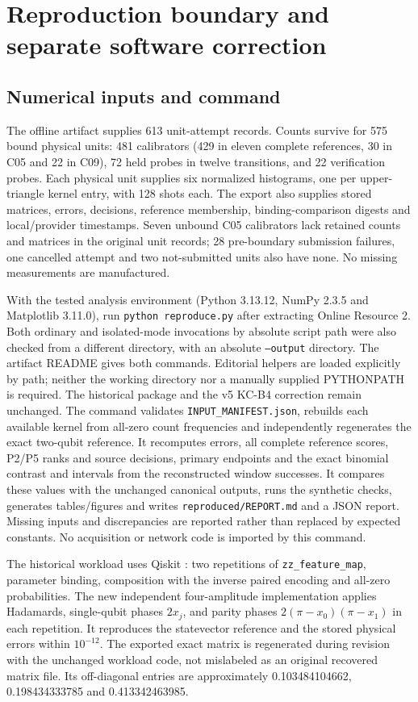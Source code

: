 \documentclass[11pt,a4paper]{article}
\begin{document}
\section{Reproduction boundary and separate software correction}
\subsection{Numerical inputs and command}
The offline artifact supplies 613 unit-attempt records. Counts survive for 575 bound physical units: 481 calibrators (429 in eleven complete references, 30 in C05 and 22 in C09), 72 held probes in twelve transitions, and 22 verification probes. Each physical unit supplies six normalized histograms, one per upper-triangle kernel entry, with 128 shots each. The export also supplies stored matrices, errors, decisions, reference membership, binding-comparison digests and local/provider timestamps. Seven unbound C05 calibrators lack retained counts and matrices in the original unit records; 28 pre-boundary submission failures, one cancelled attempt and two not-submitted units also have none. No missing measurements are manufactured.

With the tested analysis environment (Python 3.13.12, NumPy 2.3.5 and Matplotlib 3.11.0), run \texttt{python reproduce.py} after extracting Online Resource 2. Both ordinary and isolated-mode invocations by absolute script path were also checked from a different directory, with an absolute \texttt{--output} directory. The artifact README gives both commands. Editorial helpers are loaded explicitly by path; neither the working directory nor a manually supplied PYTHONPATH is required. The historical package and the v5 KC-B4 correction remain unchanged. The command validates \texttt{INPUT\_MANIFEST.json}, rebuilds each available kernel from all-zero count frequencies and independently regenerates the exact two-qubit reference. It recomputes errors, all complete reference scores, P2/P5 ranks and source decisions, primary endpoints and the exact binomial contrast and intervals from the reconstructed window successes. It compares these values with the unchanged canonical outputs, runs the synthetic checks, generates tables/figures and writes \texttt{reproduced/REPORT.md} and a JSON report. Missing inputs and discrepancies are reported rather than replaced by expected constants. No acquisition or network code is imported by this command.

The historical workload uses Qiskit \cite{javadiabhari2024qiskit}: two repetitions of \texttt{zz\_feature\_map}, parameter binding, composition with the inverse paired encoding and all-zero probabilities. The new independent four-amplitude implementation applies Hadamards, single-qubit phases $2x_j$, and parity phases $2(\pi-x_0)(\pi-x_1)$ in each repetition. It reproduces the statevector reference and the stored physical errors within $10^{-12}$. The exported exact matrix is regenerated during revision with the unchanged workload code, not mislabeled as an original recovered matrix file. Its off-diagonal entries are approximately 0.103484104662, 0.198434333785 and 0.413342463985.
\end{document}
